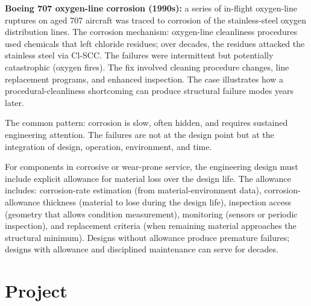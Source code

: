 \textbf{Boeing 707 oxygen-line corrosion (1990s):} a series of in-flight oxygen-line ruptures on aged 707 aircraft was traced to corrosion of the stainless-steel oxygen distribution lines. The corrosion mechanism: oxygen-line cleanliness procedures used chemicals that left chloride residues; over decades, the residues attacked the stainless steel via Cl-SCC. The failures were intermittent but potentially catastrophic (oxygen fires). The fix involved cleaning procedure changes, line replacement programs, and enhanced inspection. The case illustrates how a procedural-cleanliness shortcoming can produce structural failure modes years later.

The common pattern: corrosion is slow, often hidden, and requires sustained engineering attention. The failures are not at the design point but at the integration of design, operation, environment, and time.

\begin{principle}
For components in corrosive or wear-prone service, the engineering design must include explicit allowance for material loss over the design life. The allowance includes: corrosion-rate estimation (from material-environment data), corrosion-allowance thickness (material to lose during the design life), inspection access (geometry that allows condition measurement), monitoring (sensors or periodic inspection), and replacement criteria (when remaining material approaches the structural minimum). Designs without allowance produce premature failures; designs with allowance and disciplined maintenance can serve for decades.
\end{principle}

\section{Project}


